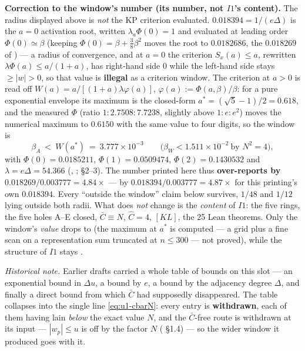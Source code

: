 \begin{v2box}
\smallskip
\noindent\textbf{Correction to the window's number (its number, not $I1$'s content).} The radius
displayed above is \emph{not} the KP criterion evaluated. $0.018394=1/(e\Delta)$ is the $a=0$
activation root, written $\lambda_a\Phi(0)=1$ and evaluated at leading order $\Phi(0)\simeq\beta$
(keeping $\Phi(0)=\beta+\tfrac38\beta^2$ moves the root to $0.0182686$, the $0.018269$ of
) --- a radius of convergence, and at $a=0$ the criterion
$S_x(a)\le a$, rewritten $\lambda\Phi(a)\le a/(1+a)$, has right-hand side $0$ while the left-hand
side stays $\ge|w|>0$, so that value is \textbf{illegal} as a criterion window. The criterion at
$a>0$ is read off $W(a)=a/[(1+a)\lambda\varphi(a)]$, $\varphi(a):=\Phi(a,\beta)/\beta$: for a pure
exponential envelope its maximum is the closed-form $a^\ast=(\sqrt5-1)/2=0.618$, and the measured
$\Phi$ (ratio $1:2.7508:7.7238$, slightly above $1:e:e^2$) moves the numerical maximum to
$0.6150$ with the same value to four digits, so the window is
\[
\beta_A\ <\ W(a^\ast)\ =\ 3.777\times10^{-3}
\qquad\bigl(\beta_W<1.511\times10^{-2}\ \text{by }N^2=4\bigr),
\]
with $\Phi(0)=0.0185211$, $\Phi(1)=0.0509474$, $\Phi(2)=0.1430532$ and $\lambda=e\Delta=54.366$
(, ;  \S2--3). The number printed here thus
\textbf{over-reports by} $0.018269/0.003777=4.84\times$ --- by $0.018394/0.003777=4.87\times$ for
this printing's own $0.018394$. Every ``outside the window'' claim below survives, $1/48$ and
$1/12$ lying outside both radii. What does \emph{not} change is the \emph{content} of $I1$: the five
rings, the five holes A--E closed, $\bar C\equiv N$, $\hat C=4$, $[KL]$, the 25 Lean theorems. Only
the window's \emph{value} drops to \LC{} (the maximum at $a^\ast$ is computed --- a grid plus a fine
scan on a representation sum truncated at $n\le300$ --- not proved), while the structure of $I1$
stays \LT{}.

\emph{Historical
note.} Earlier drafts carried a whole table of bounds on this slot --- an exponential bound in
$\Delta u$, a bound by $e$, a bound by the adjacency degree $\Delta$, and finally a direct bound
from which $\bar C$ had supposedly disappeared. The table collapses into the single line
\eqref{eq:u1-cbarN}: every entry is \textbf{withdrawn}, each of them having lain \emph{below} the
exact value $N$, and the $\bar C$-free route is withdrawn at its input --- $|w_p|\le u$ is off by
the factor $N$ ( \S1.4) --- so the wider window it produced goes with it.
\end{v2box}

